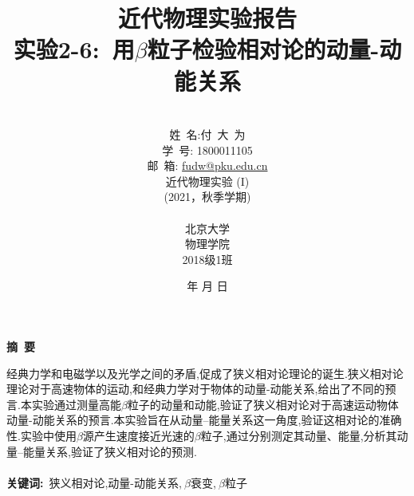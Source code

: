 \documentclass[a4paper]{article}
\begin{document}
\renewcommand{\contentsname}{目\ 录}
\renewcommand{\appendixname}{附录}
\renewcommand{\appendixpagename}{附录}
\renewcommand{\refname}{参考文献} 
\renewcommand{\figurename}{图}
\renewcommand{\tablename}{表}
\renewcommand{\today}{\number\year 年 \number\month 月 \number\day 日}
\newcommand{\refeq}[1]{\textbf{Eq.(\ref{#1})}}
\newcommand*{\circled}[1]{\lower.7ex\hbox{\tikz\draw (0pt, 0pt)%
    circle (.5em) node {\makebox[1em][c]{\small #1}};}}
    
\title{{\Huge 近代物理实验报告{\large\linebreak\\}}{\Large 实验2-6:\ 用$\beta$粒子检验相对论的动量-动能关系\linebreak\linebreak}}
\author{\\姓\ 名:付\ 大\ 为\\
学\ 号: 1800011105\\
邮\ 箱: \url{fudw@pku.edu.cn}\\
近代物理实验 (I)\\
(2021，秋季学期)\\\\
北京大学\\
物理学院\\
2018级1班}
\date{\today}
\maketitle
\newpage

\begin{center}
{\Large\bf{摘\ 要\\}}
\end{center}

经典力学和电磁学以及光学之间的矛盾,促成了狭义相对论理论的诞生.狭义相对论理论对于高速物体的运动,和经典力学对于物体的动量-动能关系,给出了不同的预言.本实验通过测量高能$\beta$粒子的动量和动能,验证了狭义相对论对于高速运动物体动量-动能关系的预言.本实验旨在从动量--能量关系这一角度,验证这相对论的准确性.实验中使用$\beta$源产生速度接近光速的$\beta$粒子,通过分别测定其动量、能量,分析其动量--能量关系,验证了狭义相对论的预测.
\\\\
{\bf{关键词}:}\ 狭义相对论,动量-动能关系,$\ \beta$衰变,$\ \beta$粒子
\newpage
\end{document}
